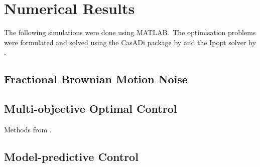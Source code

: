 \section{Numerical Results}

The following simulations were done using MATLAB.\ 
The optimisation problems were formulated and solved using the CasADi package by \cite{Andersson2019casadi} and the Ipopt solver by \cite{Waechter2006ipopt}.\ 


\subsection{Fractional Brownian Motion Noise}

\subsection{Multi-objective Optimal Control}
Methods from \cite{hoffmann2022degoc}.

\subsection{Model-predictive Control}